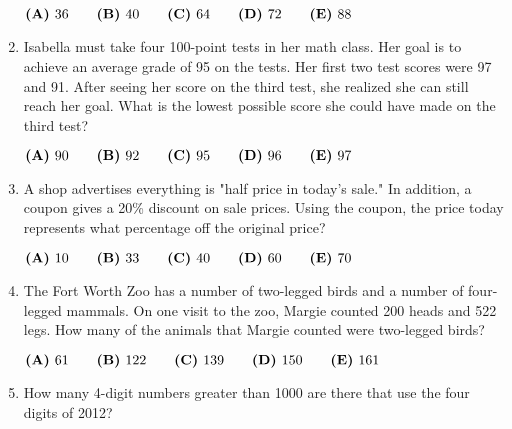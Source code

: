 \documentclass{article}
\begin{document}
\begin{enumerate}[label=\arabic*., itemsep=0.5em]
\( \textbf{(A)}\hspace{.05in}36\qquad\textbf{(B)}\hspace{.05in}40\qquad\textbf{(C)}\hspace{.05in}64\qquad\textbf{(D)}\hspace{.05in}72\qquad\textbf{(E)}\hspace{.05in}88 \)\par \vspace{0.5em}\item Isabella must take four 100-point tests in her math class. Her goal is to achieve an average grade of 95 on the tests. Her first two test scores were 97 and 91. After seeing her score on the third test, she realized she can still reach her goal. What is the lowest possible score she could have made on the third test?

\( \textbf{(A)}\hspace{.05in}90\qquad\textbf{(B)}\hspace{.05in}92\qquad\textbf{(C)}\hspace{.05in}95\qquad\textbf{(D)}\hspace{.05in}96\qquad\textbf{(E)}\hspace{.05in}97 \)\par \vspace{0.5em}\item A shop advertises everything is "half price in today's sale." In addition, a coupon gives a 20\% discount on sale prices. Using the coupon, the price today represents what percentage off the original price?

\( \textbf{(A)}\hspace{.05in}10\qquad\textbf{(B)}\hspace{.05in}33\qquad\textbf{(C)}\hspace{.05in}40\qquad\textbf{(D)}\hspace{.05in}60\qquad\textbf{(E)}\hspace{.05in}70 \)\par \vspace{0.5em}\item The Fort Worth Zoo has a number of two-legged birds and a number of four-legged mammals. On one visit to the zoo, Margie counted 200 heads and 522 legs. How many of the animals that Margie counted were two-legged birds?

\( \textbf{(A)}\hspace{.05in}61\qquad\textbf{(B)}\hspace{.05in}122\qquad\textbf{(C)}\hspace{.05in}139\qquad\textbf{(D)}\hspace{.05in}150\qquad\textbf{(E)}\hspace{.05in}161 \)\par \vspace{0.5em}\item How many 4-digit numbers greater than 1000 are there that use the four digits of 2012?


\end{enumerate}
\end{document}
